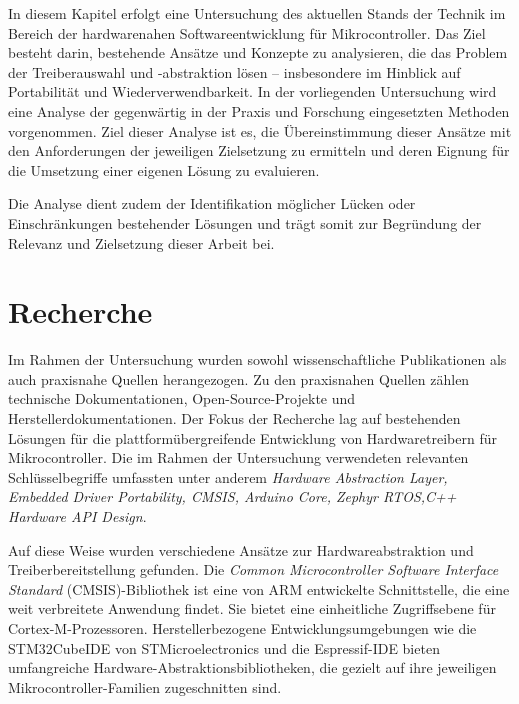 In diesem Kapitel erfolgt eine Untersuchung des aktuellen Stands der Technik im Bereich der hardwarenahen Softwareentwicklung für Mikrocontroller.
Das Ziel besteht darin, bestehende Ansätze und Konzepte zu analysieren, die das Problem der Treiberauswahl und -abstraktion lösen – insbesondere im Hinblick auf Portabilität und Wiederverwendbarkeit. 
In der vorliegenden Untersuchung wird eine Analyse der gegenwärtig in der Praxis und Forschung eingesetzten Methoden vorgenommen. 
Ziel dieser Analyse ist es, die Übereinstimmung dieser Ansätze mit den Anforderungen der jeweiligen Zielsetzung zu ermitteln und deren Eignung für die Umsetzung einer eigenen Lösung zu evaluieren.

Die Analyse dient zudem der Identifikation möglicher Lücken oder Einschränkungen bestehender Lösungen und trägt somit zur Begründung der Relevanz und Zielsetzung dieser Arbeit bei.


\section{Recherche}
Im Rahmen der Untersuchung wurden sowohl wissenschaftliche Publikationen als auch praxisnahe Quellen herangezogen. 
Zu den praxisnahen Quellen zählen technische Dokumentationen, Open-Source-Projekte und Herstellerdokumentationen.
Der Fokus der Recherche lag auf bestehenden Lösungen für die plattformübergreifende Entwicklung von Hardwaretreibern für Mikrocontroller.
Die im Rahmen der Untersuchung verwendeten relevanten Schlüsselbegriffe umfassten unter anderem \textit{Hardware Abstraction Layer, Embedded Driver Portability, CMSIS, Arduino Core, Zephyr RTOS,C++ Hardware API Design}.

Auf diese Weise wurden verschiedene Ansätze zur Hardwareabstraktion und Treiberbereitstellung gefunden.
Die \emph{Common Microcontroller Software Interface Standard} (CMSIS)-Bibliothek ist eine von ARM entwickelte Schnittstelle, die eine weit verbreitete Anwendung findet. 
Sie bietet eine einheitliche Zugriffsebene für Cortex-M-Prozessoren. 
Herstellerbezogene Entwicklungsumgebungen wie die STM32CubeIDE von STMicroelectronics und die Espressif-IDE bieten umfangreiche Hardware-Abstraktionsbibliotheken, die gezielt auf ihre jeweiligen Mikrocontroller-Familien zugeschnitten sind.


